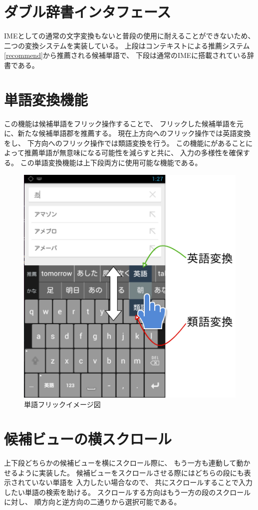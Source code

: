 \section{ダブル辞書インタフェース}
IMEとしての通常の文字変換もないと普段の使用に耐えることができないため、
二つの変換システムを実装している。
上段はコンテキストによる推薦システム\ref{recommend}から推薦される候補単語で、
下段は通常のIMEに搭載されている辞書である。


\section{単語変換機能}
この機能は候補単語をフリック操作することで、
フリックした候補単語を元に、新たな候補単語郡を推薦する。
現在上方向へのフリック操作では英語変換をし、
下方向へのフリック操作では類語変換を行う。
この機能にがあることによって推薦単語が無意味になる可能性を減らすと共に、
入力の多様性を確保する。
この単語変換機能は上下段両方に使用可能な機能である。

\begin{figure}[htbp]
  \begin{center}
    \includegraphics[width=14cm,bb=0 0 461 485]{images/candidateflick.png}
  \end{center}
  \caption{単語フリックイメージ図}
  \label{fig:wordflick}
\end{figure}

\section{候補ビューの横スクロール}
上下段どちらかの候補ビューを横にスクロール際に、
もう一方も連動して動かせるように実装した。
候補ビューをスクロールさせる際にはどちらの段にも表示されていない単語を
入力したい場合なので、
共にスクロールすることで入力したい単語の検索を助ける。
スクロールする方向はもう一方の段のスクロールに対し、
順方向と逆方向の二通りから選択可能である。

